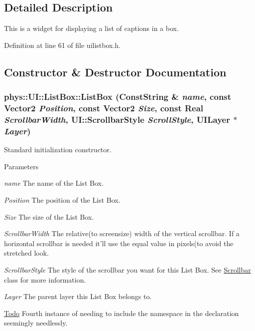 \subsection{Detailed Description}
This is a widget for displaying a list of captions in a box. 

Definition at line 61 of file uilistbox.h.



\subsection{Constructor \& Destructor Documentation}
\hypertarget{classphys_1_1UI_1_1ListBox_a0bf957f875c9a7c5361c26b5001ce821}{
\subsubsection[{ListBox}]{\setlength{\rightskip}{0pt plus 5cm}phys::UI::ListBox::ListBox ({\bf ConstString} \& {\em name}, \/  const {\bf Vector2} {\em Position}, \/  const {\bf Vector2} {\em Size}, \/  const {\bf Real} {\em ScrollbarWidth}, \/  UI::ScrollbarStyle {\em ScrollStyle}, \/  {\bf UILayer} $\ast$ {\em Layer})}}
\label{d0/d28/classphys_1_1UI_1_1ListBox_a0bf957f875c9a7c5361c26b5001ce821}


Standard initialization constructor. 


\begin{DoxyParams}{Parameters}
\item[{\em name}]The name of the List Box. \item[{\em Position}]The position of the List Box. \item[{\em Size}]The size of the List Box. \item[{\em ScrollbarWidth}]The relative(to screensize) width of the vertical scrollbar. If a horizontal scrollbar is needed it'll use the equal value in pixels(to avoid the stretched look. \item[{\em ScrollbarStyle}]The style of the scrollbar you want for this List Box. See \hyperlink{classphys_1_1UI_1_1Scrollbar}{Scrollbar} class for more information. \item[{\em Layer}]The parent layer this List Box belongs to. \end{DoxyParams}


\begin{Desc}
\item[\hyperlink{todo__todo000025}{Todo}]Fourth instance of needing to include the namespace in the declaration seemingly needlessly. \end{Desc}




